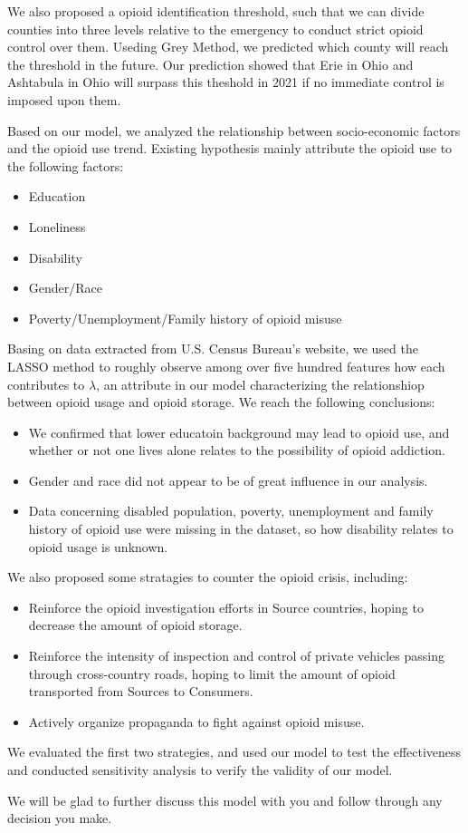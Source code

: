 We also proposed a opioid identification threshold, such that we can divide counties into three levels relative to the emergency to conduct strict opioid control over them. Useding Grey Method, we predicted which county will reach the threshold in the future. Our prediction showed that Erie in Ohio and Ashtabula in Ohio will surpass this theshold in 2021 if no immediate control is imposed upon them.

Based on our model, we analyzed the relationship between socio-economic factors and the opioid use trend. Existing hypothesis mainly attribute the opioid use to the following factors:
\begin{itemize}\setlength{\itemsep}{0pt}
	\item Education
	\item Loneliness
	\item Disability
	\item Gender/Race
	\item Poverty/Unemployment/Family history of opioid misuse
\end{itemize}

Basing on data extracted from U.S. Census Bureau's website, we used the LASSO method to roughly observe among over five hundred features how each contributes to $\lambda$, an attribute in our model characterizing the relationshiop between opioid usage and opioid storage. We reach the following conclusions:
\begin{itemize}
	\item We confirmed that lower educatoin background may lead to opioid use, and whether or not one lives alone relates to the possibility of opioid addiction.
	\item Gender and race did not appear to be of great influence in our analysis.
	\item Data concerning disabled population, poverty, unemployment and family history of opioid use were missing in the dataset, so how disability relates to opioid usage is unknown.
\end{itemize}

We also proposed some stratagies to counter the opioid crisis, including:
\begin{itemize}
	\item Reinforce the opioid investigation efforts in Source countries, hoping to decrease the amount of opioid storage.
	\item Reinforce the intensity of inspection and control of private vehicles passing through cross-country roads, hoping to limit the amount of opioid transported from Sources to Consumers.
	\item Actively organize propaganda to fight against opioid misuse.
\end{itemize}

We evaluated the first two strategies, and used our model to test the effectiveness and conducted sensitivity analysis to verify the validity of our model.

We will be glad to further discuss this model with you and follow through any decision you make. 